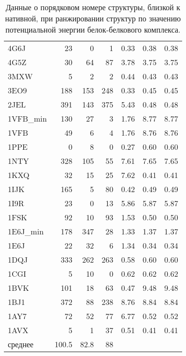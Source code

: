 \begin{table}[h]
\begin{center}
\begin{tabular}{ l | r | r | r | c | c | c }
       4G6J & 23 & 0 & 1 & 0.33 & 0.38 & 0.38 \\
       4G5Z & 30 & 64 & 87 & 3.78 & 3.75 & 3.75 \\
       3MXW & 5 & 2 & 2 & 0.44 & 0.43 & 0.43 \\
       3EO9 & 188 & 153 & 248 & 0.33 & 0.45 & 0.45 \\
       2JEL & 391 & 143 & 375 & 5.43 & 0.48 & 0.48 \\
       1VFB\_min & 130 & 27 & 3 & 1.76 & 8.77 & 8.77 \\
       1VFB & 49 & 6 & 4 & 1.76 & 8.76 & 8.76 \\
       1PPE & 0 & 8 & 0 & 0.27 & 0.60 & 0.60 \\
       1NTY & 328 & 105 & 55 & 7.61 & 7.65 & 7.65 \\
       1KXQ & 32 & 15 & 25 & 7.62 & 0.41 & 0.41 \\
       1IJK & 165 & 5 & 80 & 0.42 & 0.49 & 0.49 \\
       1I9R & 23 & 0 & 13 & 5.86 & 5.87 & 5.87 \\
       1FSK & 92 & 10 & 93 & 1.53 & 0.50 & 0.50 \\
       1E6J\_min & 178 & 347 & 28 & 1.33 & 1.37 & 1.37 \\
       1E6J & 22 & 32 & 6 & 1.34 & 0.34 & 0.34 \\
       1DQJ & 333 & 262 & 263 & 0.58 & 0.60 & 0.60 \\
       1CGI & 5 & 10 & 0 & 0.62 & 0.62 & 0.62 \\
       1BVK & 101 & 18 & 63 & 0.47 & 9.48 & 9.48 \\
       1BJ1 & 372 & 88 & 238 & 8.76 & 8.84 & 8.84 \\
       1AY7 & 72 & 52 & 77 & 6.77 & 0.52 & 0.52 \\
       1AVX & 5 & 1 & 37 & 0.51 & 0.41 & 0.41 \\
       \hline
       среднее & 100.5 & 82.8 & 88 &
    \end{tabular}
    \end{center}
    \caption{Данные о порядковом номере структуры, близкой к нативной, при ранжировании структур по значению потенциальной энергии белок-белкового комплекса. }
    \label{table_res_1}
  \end{table}


